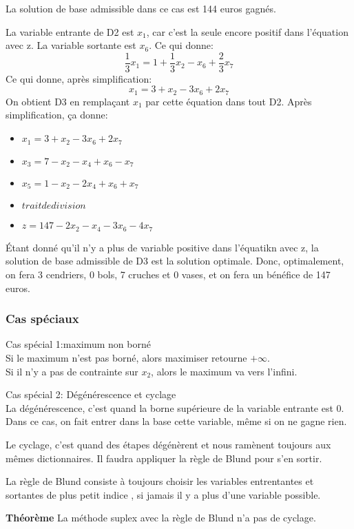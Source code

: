 La solution de base admissible dans ce cas est 144 euros
gagnés.

La variable entrante de D2 est $x_1$, car c'est la seule
encore positif dans l'équation avec z. La variable
sortante est $x_6$. Ce qui donne:
$$\frac{1}{3}x_1 = 1 + \frac{1}{3}x_2 - x_6 + \frac{2}{3}x_7$$
Ce qui donne, après simplification:
$$x_1 = 3 + x_2 - 3x_6 + 2x_7$$
On obtient D3 en remplaçant $x_1$ par cette équation
dans tout D2. Après simplification, ça donne:
\begin{itemize}
    \item $x_1 = 3 + x_2 - 3x_6 + 2x_7$
    \item $x_3 = 7 - x_2 - x_4 + x_6 - x_7$
    \item $x_5 = 1 - x_2 - 2x_4 + x_6 + x_7$
    \item $trait de division$
    \item $z = 147 -2x_2 - x_4 - 3x_6 - 4x_7$
\end{itemize}

Étant donné qu'il n'y a plus de variable positive dans
l'équatikn avec z, la solution de base admissible de D3
est la solution optimale. Donc, optimalement, on fera
3 cendriers, 0 bols, 7 cruches et 0 vases, et on fera
un bénéfice de 147 euros.

\subsubsection{Cas spéciaux}
Cas spécial 1:maximum non borné\\
Si le maximum n'est pas borné, alors maximiser retourne $+\infty$.\\
Si il n'y a pas de contrainte sur $x_2$, alors le
maximum va vers l'infini.

Cas spécial 2: Dégénérescence et cyclage\\
La dégénérescence, c'est quand la borne supérieure de la
variable entrante est 0. Dans ce cas, on fait entrer
dans la base cette variable, même si on ne gagne rien.

Le cyclage, c'est quand des étapes dégénèrent et nous
ramènent toujours aux mêmes dictionnaires. Il faudra
appliquer la règle de Blund pour s'en sortir.

La règle de Blund consiste à toujours choisir les
variables entrentantes et sortantes de plus petit indice
, si jamais il y a plus d'une variable possible.

\textbf{Théorème} La méthode suplex avec la règle de
Blund n'a pas de cyclage.
